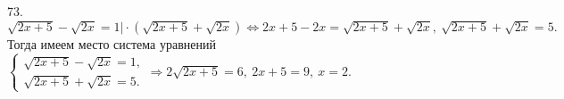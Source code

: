 73. $\sqrt{2x+5}-\sqrt{2x}=1\Big|\cdot(\sqrt{2x+5}+\sqrt{2x})\Leftrightarrow 2x+5-2x=\sqrt{2x+5}+\sqrt{2x},\ \sqrt{2x+5}+\sqrt{2x}=5.$ Тогда имеем место система уравнений $\begin{cases}\sqrt{2x+5}-\sqrt{2x}=1,\\ \sqrt{2x+5}+\sqrt{2x}=5.\end{cases}\Rightarrow 2\sqrt{2x+5}=6,\ 2x+5=9,\ x=2.$\\

